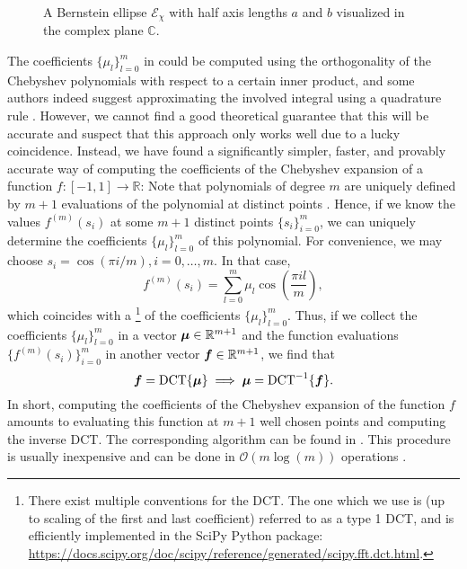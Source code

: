 \begin{figure}[ht]
    \centering
    
    \caption{A Bernstein ellipse $\mathcal{E}_{\chi}$ with half axis lengths $a$ and
        $b$ visualized in the complex plane $\mathbb{C}$.}
    \label{fig:2-chebyshev-proof-bernstein-ellipse}
\end{figure}

The coefficients $\{\mu_l\}_{l=0}^{m}$ in 
could be computed using the orthogonality of the Chebyshev polynomials with respect
to a certain inner product, and some authors indeed suggest approximating the
involved integral using a quadrature rule \cite[equation~8, algorithm~1]{lin2017randomized}.
However, we cannot find a good theoretical guarantee that this will be accurate
and suspect that this approach only works well due to a lucky coincidence.
Instead, we
have found a significantly simpler, faster, and provably accurate way of
computing the coefficients of the Chebyshev expansion of a function $f:[-1,1] \to \mathbb{R}$:
Note that polynomials of degree $m$ are uniquely defined by $m+1$
evaluations of the polynomial at distinct points \cite{gauss1799demonstratio}.
Hence, if we know the values $f^{(m)}(s_i)$ at some $m+1$ distinct points 
$\{s_i\}_{i=0}^m$, we can uniquely determine the coefficients $\{\mu_l\}_{l=0}^{m}$
of this polynomial. For convenience, we may choose $s_i = \cos(\pi i/m), i=0,\dots,m$.
In that case,
\begin{equation}
    f^{(m)}(s_i) = \sum_{l=0}^{m} \mu_l \cos\left(\frac{\pi i l}{m}\right),
    \label{equ:2-chebyshev-chebyshev-nodes-evaluation}
\end{equation}
which coincides with a \footnote{There exist multiple conventions for the DCT.
The one which we use is (up to scaling of the first and last coefficient)
referred to as a type 1 DCT, and is efficiently implemented in the SciPy Python package:
\url{https://docs.scipy.org/doc/scipy/reference/generated/scipy.fft.dct.html}.} of the coefficients $\{\mu_l\}_{l=0}^{m}$.
Thus, if we collect the coefficients $\{\mu_l\}_{l=0}^{m}$ in a vector $\boldsymbol{\mu} \in \mathbb{R}^{m+1}$ 
and the function evaluations $\{f^{(m)}(s_i)\}_{i=0}^{m}$ in another
vector $\boldsymbol{f} \in \mathbb{R}^{m+1}$, we find that
\begin{equation}
    \boldsymbol{f} = \operatorname{DCT} \{ \boldsymbol{\mu} \} \implies \boldsymbol{\mu} = \operatorname{DCT}^{-1}\{ \boldsymbol{f} \}.
    \label{equ:2-chebyshev-chebyshev-DCT}
\end{equation}
In short, computing the coefficients of the Chebyshev expansion 
of the function $f$ amounts to evaluating this function at $m+1$ well
chosen points and computing the inverse \gls{DCT}. The corresponding algorithm
can be found in .
This procedure is usually inexpensive and can be done in $\mathcal{O}(m \log(m))$
operations \cite{makhoul1980fct}.


